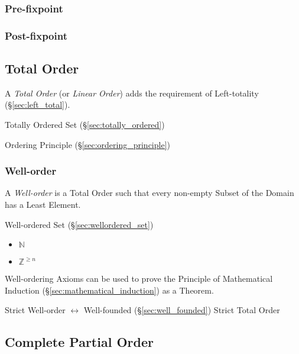 \subsubsection{Pre-fixpoint}\label{sec:prefixpoint}

\subsubsection{Post-fixpoint}\label{sec:postfixpoint}



\subsection{Total Order}\label{sec:total_order}

A \emph{Total Order} (or \emph{Linear Order}) adds the requirement of
Left-totality (\S\ref{sec:left_total}).

Totally Ordered Set (\S\ref{sec:totally_ordered})

Ordering Principle (\S\ref{sec:ordering_principle})



\subsubsection{Well-order}\label{sec:well_order}

A \emph{Well-order} is a Total Order such that every non-empty Subset
of the Domain has a Least Element.

Well-ordered Set (\S\ref{sec:wellordered_set})

\begin{itemize}
  \item $\mathbb{N}$
  \item $\mathbb{Z}^{\geq n}$
\end{itemize}

Well-ordering Axioms can be used to prove the Principle of
Mathematical Induction (\S\ref{sec:mathematical_induction}) as a
Theorem.

Strict Well-order $\leftrightarrow$ Well-founded
(\S\ref{sec:well_founded}) Strict Total Order



\subsection{Complete Partial Order}\label{sec:complete_partialorder}

